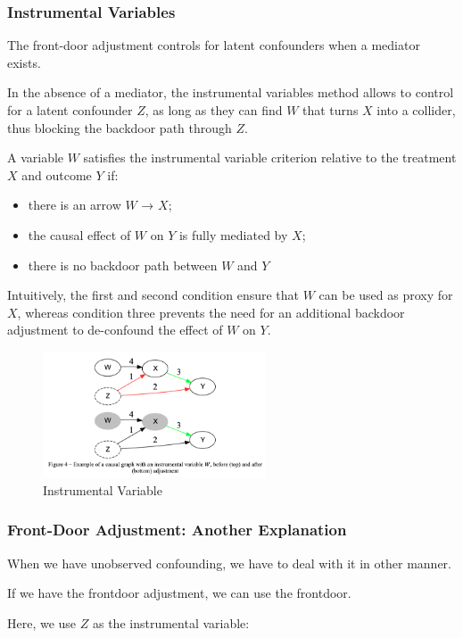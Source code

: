 \documentclass{article}
\begin{document}
\subsubsection{Instrumental Variables}
The front-door adjustment controls for latent confounders when a mediator exists.

In the absence of a mediator, the instrumental variables method allows to control for a latent confounder $Z$, as long as they can find $W$ that turns $X$ into a collider, thus blocking the backdoor path through $Z$.

A variable $W$ satisfies the instrumental variable criterion relative to the treatment $X$ and outcome $Y$ if:
\begin{itemize}
  \item there is an arrow $W$ → $X$;
  \item the causal effect of $W$ on $Y$ is fully mediated by $X$;
  \item there is no backdoor path between $W$ and $Y$
\end{itemize}

Intuitively, the first and second condition ensure that $W$ can be used as proxy for $X$, whereas condition three prevents the need for an additional backdoor adjustment to de-confound the effect of $W$ on $Y$.

\begin{figure}[H]
  \centering
  \includegraphics[width=250px]{draft-photos/instrumental_variables.png}
  \caption{Instrumental Variable}
  \label{fig:instrumental_variables}
\end{figure}

\subsubsection{Front-Door Adjustment: Another Explanation}

When we have unobserved confounding, we have to deal with it in other manner.

If we have the frontdoor adjustment, we can use the frontdoor.

Here, we use $Z$ as the instrumental variable:
\end{document}
